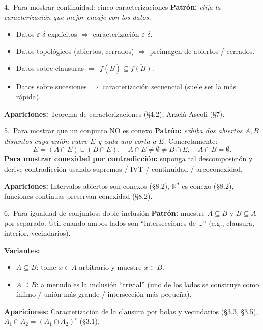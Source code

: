 \documentclass[11pt,twoside]{article}
\newcommand{\R}{\mathbb{R}}
\begin{document}
\begin{strategybox}{4.\ Para mostrar continuidad: cinco caracterizaciones}
\textbf{Patrón:} \textit{elija la caracterización que mejor encaje con los datos.}
\begin{itemize}[leftmargin=1.5em]
\item Datos $\varepsilon$-$\delta$ explícitos $\Rightarrow$ caracterización $\varepsilon$-$\delta$.
\item Datos topológicos (abiertos, cerrados) $\Rightarrow$ preimagen de abiertos / cerrados.
\item Datos sobre clausuras $\Rightarrow$ $f(\overline{B}) \subseteq \overline{f(B)}$.
\item Datos sobre sucesiones $\Rightarrow$ caracterización secuencial (suele ser la más rápida).
\end{itemize}
\textbf{Apariciones:} Teorema de caracterizaciones (§4.2), Arzelà-Ascoli (§7).
\end{strategybox}
\newpage
\begin{strategybox}{5.\ Para mostrar que un conjunto NO es conexo}
\textbf{Patrón:} \textit{exhiba dos abiertos $A, B$ disjuntos cuya unión cubre $E$ y cada uno corta a $E$.}
Concretamente:
\[
E = (A \cap E) \sqcup (B \cap E), \quad A \cap E \neq \emptyset \neq B \cap E, \quad A \cap B = \emptyset.
\]
\textbf{Para mostrar conexidad por contradicción:} suponga tal descomposición y derive contradicción usando supremos / IVT / continuidad / arcoconexidad.

\textbf{Apariciones:} Intervalos abiertos son conexos (§8.2), $\R^{d}$ es conexo (§8.2), funciones continuas preservan conexidad (§8.2).
\end{strategybox}

\begin{strategybox}{6.\ Para igualdad de conjuntos: doble inclusión}
\textbf{Patrón:} muestre $A \subseteq B$ y $B \subseteq A$ por separado.
Útil cuando ambos lados son ``intersecciones de \dots'' (e.g., clausura, interior, vecindarios).

\textbf{Variantes:}
\begin{itemize}[leftmargin=1.5em]
\item $A \subseteq B$: tome $x \in A$ arbitrario y muestre $x \in B$.
\item $A \supseteq B$: a menudo es la inclusión ``trivial'' (uno de los lados se construye como ínfimo / unión más grande / intersección más pequeña).
\end{itemize}
\textbf{Apariciones:} Caracterización de la clausura por bolas y vecindarios (§3.3, §3.5), $A_{1}^{\circ} \cap A_{2}^{\circ} = (A_{1}\cap A_{2})^{\circ}$ (§3.1).
\end{strategybox}
\end{document}
